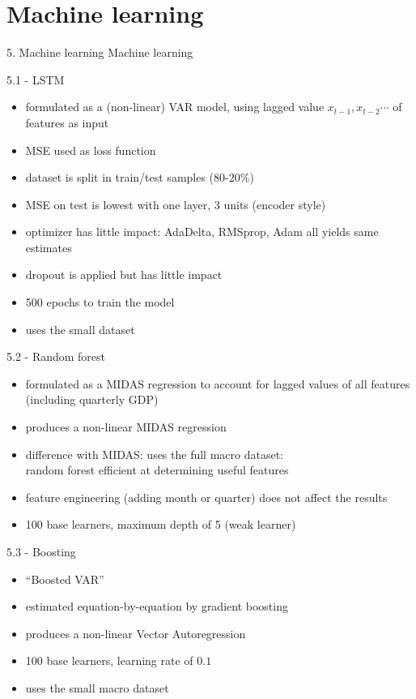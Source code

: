 \section{Machine learning}

\begin{frame}{5. Machine learning}
\centering
\Huge{Machine learning}
\end{frame}


\begin{frame}{5.1 - LSTM}
\begin{itemize}
	\item formulated as a (non-linear) VAR model, using lagged value $x_{t-1}, x_{t-2} \cdots$ of features as input
	\item MSE used as loss function
	\item dataset is split in train/test samples (80-20\%)
	\item MSE on test is lowest with one layer, 3 units (encoder style)
	\item optimizer has little impact: AdaDelta, RMSprop, Adam all yields same estimates
	\item dropout is applied but has little impact
	\item 500 epochs to train the model
	\item uses the small dataset
\end{itemize}	
\end{frame}

\begin{frame}{5.2 - Random forest}
\begin{itemize}
	\item formulated as a MIDAS regression to account for lagged values of all features (including quarterly GDP)
	\item produces a non-linear MIDAS regression
	\item difference with MIDAS: uses the full macro dataset: \\
	random forest efficient at determining useful features
	\item feature engineering (adding month or quarter) does not affect the results
	\item 100 base learners, maximum depth of 5 (weak learner)
\end{itemize}
\end{frame}

\begin{frame}{5.3 - Boosting}
\begin{itemize}
	\item ``Boosted VAR''
	\item estimated equation-by-equation by gradient boosting
	\item produces a non-linear Vector Autoregression
	\item 100 base learners, learning rate of $0.1$
	\item uses the small macro dataset
\end{itemize}
\end{frame}